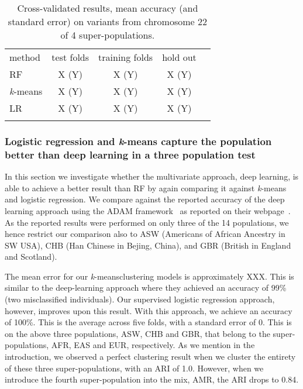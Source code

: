 \documentclass{llncs}
\newcommand{\kMeans}{\textit{k}-means}
\begin{document}
{\begin{table}
\caption{Cross-validated results, mean accuracy (and standard error) on variants from chromosome 22 of 4 super-populations.}
\begin{center}
\renewcommand{\arraystretch}{1.4}
\setlength\tabcolsep{3pt}
\begin{tabular}{lcccc}
\hline\noalign{\smallskip}
method  & test folds & training folds & hold out \\
RF  & X (Y) & X (Y) & X (Y) \\
\kMeans & X (Y) & X (Y) & X (Y) \\
LR & X (Y) & X (Y) & X (Y) \\
\noalign{\smallskip}
\hline
\label{RF}
\end{tabular}
\end{center}
\end{table}




\subsubsection{Logistic regression and \kMeans{} capture the population better than deep learning in a three population test}
In this section we investigate whether the multivariate approach, deep learning, is able to achieve a better result than
RF by again comparing it against \kMeans{} and logistic regression.  We compare against the reported accuracy of the
deep learning approach using the {\sc ADAM} framework~\cite{Massie2013} as reported on their webpage~\cite{Ferguson}.
As the reported results were performed on only three of the 14 populations, we hence restrict our comparison also to ASW
(Americans of African Ancestry in SW USA), CHB (Han Chinese in Bejing, China), and GBR (British in England and
Scotland).

The mean error for our \kMeans clustering models is approximately XXX. This is similar to the deep-learning approach
where they achieved an accuracy of 99\% (two misclassified individuals). Our supervised logistic regression approach,
however, improves upon this result.  With this approach, we achieve an accuracy of 100\%. This is the average across
five folds, with a standard error of 0. This is on the above three populations, ASW, CHB and GBR, that belong to the
super-populations, AFR, EAS and EUR, respectively.  As we mention in the introduction, we observed a perfect clustering
result when we cluster the entirety of these three super-populations, with an ARI of 1.0. However, when we introduce the
fourth super-population into the mix, AMR, the ARI drops to 0.84.


}
\end{document}
